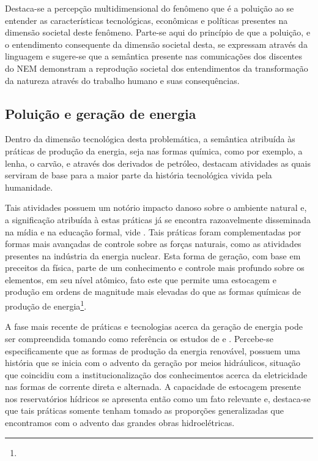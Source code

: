 \documentclass[
  12pt,       %
  openright,      %
  twoside,      %
  a4paper,      %
  english,      %
  french,       %
  spanish,      %
  brazil        %
  ]{abntex2}
\begin{document}
Destaca-se a percepção multidimensional do fenômeno que é a poluição ao se entender as características tecnológicas, econômicas e políticas presentes na dimensão societal deste fenômeno. Parte-se aqui do princípio de que a poluição, e o entendimento consequente da dimensão societal desta, se expressam através da linguagem e sugere-se que a semântica presente nas comunicações dos discentes do NEM demonstram a reprodução societal dos entendimentos da transformação da natureza através do trabalho humano e suas consequências.


\subsection{Poluição e geração de energia}

Dentro da dimensão tecnológica desta problemática, a semântica atribuída às práticas de produção da energia, seja nas formas química, como por exemplo, a lenha, o carvão, e através dos derivados de petróleo, destacam atividades as quais serviram de base para a maior parte da história tecnológica vivida pela humanidade.

Tais atividades possuem um notório impacto danoso sobre o ambiente natural e, a significação atribuída à estas práticas já se encontra razoavelmente disseminada na mídia e na educação formal, vide . Tais práticas foram complementadas por formas mais avançadas de controle sobre as forças naturais, como as atividades presentes na indústria da energia nuclear. Esta forma de geração, com base em preceitos da física, parte de um conhecimento e controle mais profundo sobre os elementos, em seu nível atômico, fato este que permite uma estocagem e produção em ordens de magnitude mais elevadas do que as formas químicas de produção de energia\footnote{}.

A fase mais recente de práticas e tecnologias acerca da geração de energia pode ser compreendida tomando como referência os estudos de  e . Percebe-se especificamente que as formas de produção da energia renovável, possuem uma história que se inicia com o advento da geração por meios hidráulicos, situação que coincidiu com a institucionalização dos conhecimentos acerca da eletricidade nas formas de corrente direta e alternada. A capacidade de estocagem presente nos reservatórios hídricos se apresenta então como um fato relevante e, destaca-se que tais práticas somente tenham tomado as proporções generalizadas que encontramos com o advento das grandes obras hidroelétricas. 
\end{document}
